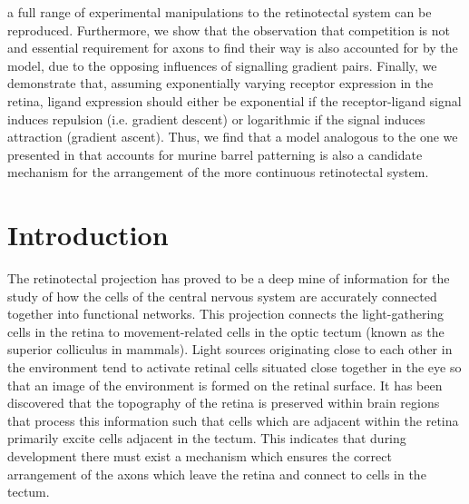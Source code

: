 \documentclass[11pt, a4paper]{article}
\begin{document}
{a full range of experimental manipulations to the retinotectal system can be
reproduced. Furthermore, we show that the observation that competition is not
and essential requirement for axons to find their
way \citep{gosse_retinotopic_2008} is also accounted for by the model, due to
the opposing influences of signalling gradient pairs. Finally, we demonstrate
that, assuming exponentially varying receptor expression in the retina, ligand
expression should either be exponential if the receptor-ligand signal induces
repulsion (i.e. gradient descent) or logarithmic if the signal induces
attraction (gradient ascent). Thus, we find that a model analogous to the one
we presented in \citet{james_modelling_2020} that accounts for murine barrel
patterning is also a candidate mechanism for the arrangement of the more
continuous retinotectal system.}

\section{Introduction}

The retinotectal projection has proved to be a deep mine of information for
the study of how the cells of the central nervous system are accurately
connected together into functional networks. This projection connects the
light-gathering cells in the retina to movement-related cells in the optic
tectum (known as the superior colliculus in mammals). Light sources
originating close to each other in the environment tend to activate retinal
cells situated close together in the eye so that an image of the environment
is formed on the retinal surface. It has been discovered that the topography
of the retina is preserved within brain regions that process this information
such that cells which are adjacent within the retina primarily excite cells
adjacent in the tectum. This indicates that during development there must
exist a mechanism which ensures the correct arrangement of the axons which
leave the retina and connect to cells in the tectum.
\end{document}
